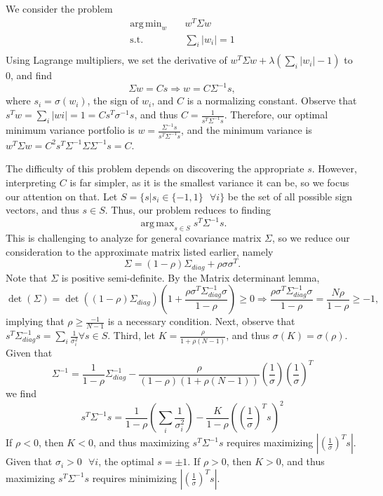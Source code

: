 \documentclass[10pt,twoside,titlepage]{article}   %
\DeclareMathOperator*{\argmax}{arg\,max}
\DeclareMathOperator*{\argmin}{arg\,min}
\begin{document}
We consider the problem
\begin{equation}
\begin{aligned}
\argmin_{w} \quad & w^T \Sigma w \\
\textrm{s.t.} \quad & \sum_i |w_i| = 1\\
\end{aligned}
\end{equation}
Using Lagrange multipliers, we set the derivative of $w^T \Sigma w + \lambda ( \sum_i |w_i| - 1 )$ to $0$, and find
\[
\Sigma w = Cs \Rightarrow w = C\Sigma^{-1}s,
\]
where $s_i = \sigma(w_i)$, the sign of $w_i$, 
and $C$ is a normalizing constant. 
Observe that $s^T w = \sum_i |wi| = 1 = Cs^T\sigma^{-1}s$, 
and thus $C = \frac{1}{s^T\Sigma^{-1}s}$. 
Therefore, our optimal minimum variance portfolio is $w = \frac{\Sigma^{-1}s}{s^T\Sigma^{-1}s}$, 
and the minimum variance is $w^T \Sigma w = C^2 s^T \Sigma^{-1}\Sigma \Sigma^{-1}s = C$.

The difficulty of this problem depends on discovering the appropriate $s$. 
However, interpreting $C$ is far simpler, as it is the smallest variance it can be, so we focus our attention on that. 
Let $S = \{s | s_i \in \{-1,1\} \textrm{ } \forall i \}$ be the set of all possible sign vectors, 
and thus $s \in S$. 
Thus, our problem reduces to finding
\[
\argmax_{s\in S} s^T \Sigma^{-1} s.
\]
This is challenging to analyze for general covariance matrix $\Sigma$, 
so we reduce our consideration to the approximate matrix listed earlier, 
namely
\[
\Sigma = (1-\rho) \Sigma_{diag} + \rho \sigma \sigma^T.
\]
Note that $\Sigma$ is positive semi-definite. 
By the Matrix determinant lemma,
\[
\operatorname{det}(\Sigma) = \operatorname{det}( (1-\rho)\Sigma_{diag}) \left( 1 + \frac{\rho \sigma^T \Sigma_{diag}^{-1} \sigma}{1-\rho} \right) \geq 0 \Rightarrow \frac{\rho \sigma^T \Sigma_{diag}^{-1} \sigma}{1-\rho} = \frac{ N\rho}{1-\rho} \geq -1 ,
\]
implying that $\rho \geq \frac{-1}{N-1}$ is a necessary condition. 
Next, observe that $s^T \Sigma_{diag}^{-1} s = \sum_i \frac{1}{ \sigma_i^2 } \forall s \in S$. 
Third, let $K = \frac{\rho}{ 1+ \rho (N-1) }$, and thus $\sigma(K)= \sigma(\rho)$. 
Given that
\[
\Sigma^{-1} = \frac{1}{1 - \rho} \Sigma_{diag}^{-1} - \frac{ \rho }{ (1-\rho) (1 + \rho (N-1) ) } \left( \frac{1}{\sigma} \right) \left( \frac{1}{\sigma} \right)^T
\]
we find
\[
s^T \Sigma^{-1} s = \frac{1}{1-\rho} \left( \sum_i \frac{1}{\sigma_i^2} \right) - \frac{K}{1-\rho} \left( \left( \frac{1}{\sigma} \right)^T s \right)^2
\]
If $\rho < 0$, then $K<0$, and thus maximizing $s^T \Sigma^{-1} s$ 
requires maximizing $| \left( \frac{1}{\sigma} \right)^T s |$. 
Given that $\sigma_i>0 \textrm{ } \forall i$, the optimal $s = \pm 1$. 
If $\rho > 0$, then $K > 0$, 
and thus maximizing $s^T \Sigma^{-1} s$ requires minimizing $| \left( \frac{1}{\sigma} \right)^T s |$.
\end{document}
